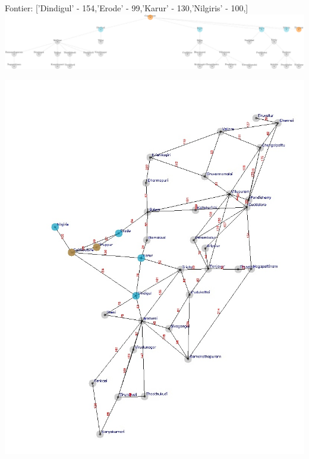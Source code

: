 \documentclass[xcolor=table]{beamer}
\begin{document}
\begin{frame}
  { \tiny Fontier: ['Dindigul' - 154,'Erode' - 99,'Karur' - 130,'Nilgiris' - 100,] }
  \includegraphics[width=1\textwidth]{../UCSNodes/4-1.png}
  \begin{center}
    \includegraphics[height=0.6\textheight]{../UCSoutput/tamilUCS2.jpg}
  \end{center}
\end{frame}
\end{document}
